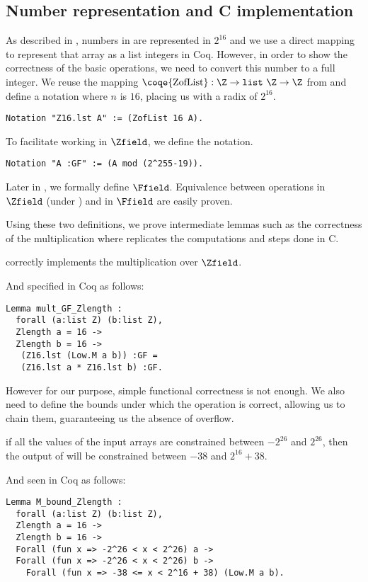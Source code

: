\subsection{Number representation and C implementation}
\label{subsec:num-repr-rfc}

As described in , numbers in  are represented
in   $2^{16}$ and we use a direct mapping to represent that array as a list
integers in Coq. However, in order to show the correctness of the basic operations,
we need to convert this number to a full integer.
We reuse the mapping
$\text{\coqe{ZofList}} : \Z \rightarrow \texttt{list}~\Z \rightarrow \Z$ from 
and define a notation where $n$ is $16$, placing us with a radix of $2^{16}$.
\begin{lstlisting}[language=Coq]
Notation "Z16.lst A" := (ZofList 16 A).
\end{lstlisting}
To facilitate working in $\Zfield$, we define the  notation.
\begin{lstlisting}[language=Coq]
Notation "A :GF" := (A mod (2^255-19)).
\end{lstlisting}
Later in , we formally define $\Ffield$.
Equivalence between operations in $\Zfield$ (\ie under ) and in $\Ffield$ are easily proven.

Using these two definitions, we prove intermediate lemmas such as the correctness of the
multiplication  where  replicates the computations and steps done in C.
\begin{lemma}
  \label{lemma:mult_correct}
   correctly implements the multiplication over $\Zfield$.
\end{lemma}
And specified in Coq as follows:
\begin{lstlisting}[language=Coq]
Lemma mult_GF_Zlength :
  forall (a:list Z) (b:list Z),
  Zlength a = 16 ->
  Zlength b = 16 ->
   (Z16.lst (Low.M a b)) :GF =
   (Z16.lst a * Z16.lst b) :GF.
\end{lstlisting}

However for our purpose, simple functional correctness is not enough.
We also need to define the bounds under which the operation is correct,
allowing us to chain them, guaranteeing us the absence of overflow.

\begin{lemma}
  \label{lemma:mult_bounded}
  if all the values of the input arrays are constrained between $-2^{26}$ and $2^{26}$,
  then the output of  will be constrained between $-38$ and $2^{16} + 38$.
\end{lemma}
And seen in Coq as follows:
\begin{lstlisting}[language=Coq]
Lemma M_bound_Zlength :
  forall (a:list Z) (b:list Z),
  Zlength a = 16 ->
  Zlength b = 16 ->
  Forall (fun x => -2^26 < x < 2^26) a ->
  Forall (fun x => -2^26 < x < 2^26) b ->
    Forall (fun x => -38 <= x < 2^16 + 38) (Low.M a b).
\end{lstlisting}
